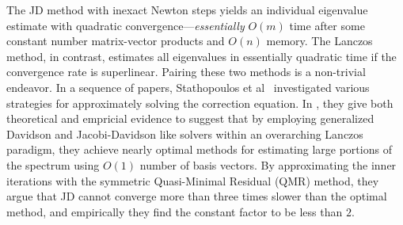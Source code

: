 \documentclass[10pt]{article}
\numberwithin{equation}{section}
\newcommand{\+}{%
	\raisebox{0.18ex}{\scaleobj{0.55}{+}}
}
\theoremstyle{definition}
\begin{document}
The JD method with inexact Newton steps yields an individual eigenvalue estimate with quadratic convergence---\emph{essentially} $O(m)$ time after some constant number matrix-vector products and $O(n)$ memory.
The Lanczos method, in contrast, estimates all eigenvalues in essentially quadratic time if the convergence rate is superlinear. Pairing these two methods is a non-trivial endeavor. 
In a sequence of papers, Stathopoulos et al~\cite{} investigated various strategies for approximately solving the correction equation. 
In , they give both theoretical and empricial evidence to suggest that by employing generalized Davidson and Jacobi-Davidson like solvers within an overarching Lanczos paradigm, they achieve nearly optimal methods for estimating large portions of the spectrum using $O(1)$ number of basis vectors. By approximating the inner iterations with the symmetric Quasi-Minimal Residual (QMR) method, they argue that JD cannot converge more than three times slower than the optimal method, and empirically they find the constant factor to be less than $2$. 







 


\end{document}
